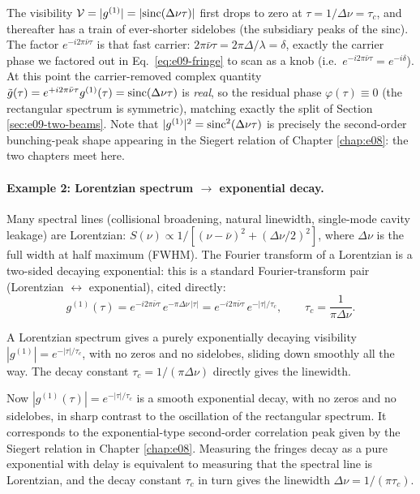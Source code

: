 The visibility \(\mathcal V=|g^{(1)}|=|{\rm sinc}(\Delta\nu\tau)|\) first drops to zero at \(\tau=1/\Delta\nu=\tau_c\), and thereafter has a train of ever-shorter sidelobes (the subsidiary peaks of the sinc). The factor \(e^{-i2\pi\bar\nu\tau}\) is that fast carrier: \(2\pi\bar\nu\tau=2\pi\Delta/\lambda=\delta\), exactly the carrier phase we factored out in Eq.~\eqref{eq:e09-fringe} to scan as a knob (i.e.\ \(e^{-i2\pi\bar\nu\tau}=e^{-i\delta}\)). At this point the carrier-removed complex quantity \(\tilde g(\tau)=e^{+i2\pi\bar\nu\tau}g^{(1)}(\tau)={\rm sinc}(\Delta\nu\tau)\) is \emph{real}, so the residual phase \(\varphi(\tau)\equiv0\) (the rectangular spectrum is symmetric), matching exactly the split of Section \ref{sec:e09-two-beams}. Note that \(|g^{(1)}|^2={\rm sinc}^2(\Delta\nu\tau)\) is precisely the second-order bunching-peak shape appearing in the Siegert relation of Chapter \ref{chap:e08}: the two chapters meet here.

\paragraph{Example 2: Lorentzian spectrum \(\to\) exponential decay.} Many spectral lines (collisional broadening, natural linewidth, single-mode cavity leakage) are Lorentzian: \(S(\nu)\propto 1/[(\nu-\bar\nu)^2+(\Delta\nu/2)^2]\), where \(\Delta\nu\) is the full width at half maximum (FWHM). The Fourier transform of a Lorentzian is a two-sided decaying exponential: this is a standard Fourier-transform pair (Lorentzian \(\leftrightarrow\) exponential), cited directly:
\begin{equation}
  g^{(1)}(\tau)=e^{-i2\pi\bar\nu\tau}\,e^{-\pi\Delta\nu\,|\tau|}
  =e^{-i2\pi\bar\nu\tau}\,e^{-|\tau|/\tau_c},
  \qquad
  \tau_c=\frac{1}{\pi\Delta\nu} .
  \label{eq:e09-lorentz-exp}
\end{equation}
\begin{formulaexplain}
A Lorentzian spectrum gives a purely exponentially decaying visibility \(|g^{(1)}|=e^{-|\tau|/\tau_c}\), with no zeros and no sidelobes, sliding down smoothly all the way. The decay constant \(\tau_c=1/(\pi\Delta\nu)\) directly gives the linewidth.
\end{formulaexplain}
Now \(|g^{(1)}(\tau)|=e^{-|\tau|/\tau_c}\) is a smooth exponential decay, with no zeros and no sidelobes, in sharp contrast to the oscillation of the rectangular spectrum. It corresponds to the exponential-type second-order correlation peak given by the Siegert relation in Chapter \ref{chap:e08}. Measuring the fringes decay as a pure exponential with delay is equivalent to measuring that the spectral line is Lorentzian, and the decay constant \(\tau_c\) in turn gives the linewidth \(\Delta\nu=1/(\pi\tau_c)\).

